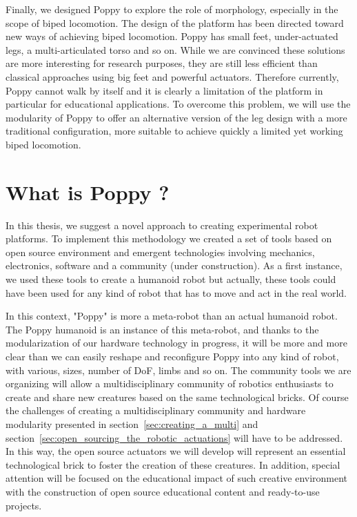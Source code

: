 Finally, we designed Poppy to explore the role of morphology, especially in the scope of biped locomotion. The design of the platform has been directed toward new ways of achieving biped locomotion. Poppy has small feet, under-actuated legs, a multi-articulated torso and so on. While we are convinced these solutions are more interesting for research purposes, they are still less efficient than classical approaches using big feet and powerful actuators.
Therefore currently, Poppy cannot walk by itself and it is clearly a limitation of the platform in particular for educational applications. To overcome this problem, we will use the modularity of Poppy to offer an alternative version of the leg design with a more traditional configuration, more suitable to achieve quickly a limited yet working biped locomotion.



\section{What is Poppy ?} %
\label{sec:what_is_poppy}

In this thesis, we suggest a novel approach to creating experimental robot platforms. To implement this methodology we created a set of tools based on open source environment and emergent technologies involving mechanics, electronics, software and a community (under construction). As a first instance, we used these tools to create a humanoid robot but actually, these tools could have been used for any kind of robot that has to move and act in the real world.

In this context, "Poppy" is more a meta-robot than an actual humanoid robot. The Poppy humanoid is an instance of this meta-robot, and thanks to the modularization of our hardware technology in progress, it will be more and more clear than we can easily reshape and reconfigure Poppy into any kind of robot, with various, sizes, number of DoF, limbs and so on. The community tools we are organizing will allow a multidisciplinary community of robotics enthusiasts to create and share new creatures based on the same technological bricks. Of course the challenges of creating a multidisciplinary community and hardware modularity presented in section~\ref{sec:creating_a_multi} and section~\ref{sec:open_sourcing_the_robotic_actuations} will have to be addressed. In this way, the open source actuators we will develop will represent an essential technological brick to foster the creation of these creatures. In addition, special attention will be focused on the educational impact of such creative environment with the construction of open source educational content and ready-to-use projects.


